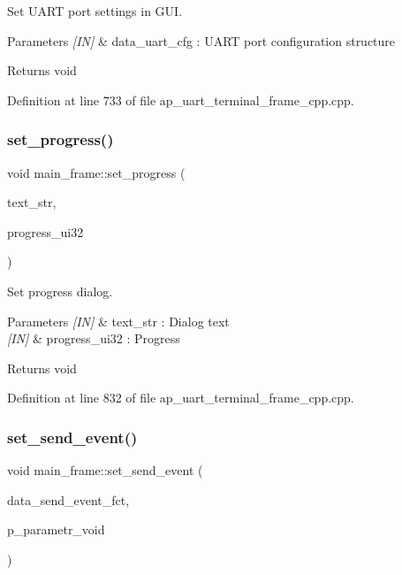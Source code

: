 Set U\+A\+RT port settings in G\+UI. 


\begin{DoxyParams}{Parameters}
{\em \mbox{[}\+I\+N\mbox{]}} & data\+\_\+uart\+\_\+cfg \+: U\+A\+RT port configuration structure \\
\hline
\end{DoxyParams}
\begin{DoxyReturn}{Returns}
void 
\end{DoxyReturn}


Definition at line 733 of file ap\+\_\+uart\+\_\+terminal\+\_\+frame\+\_\+cpp.\+cpp.

\mbox{\label{group___u_a_r_t__terminal_ga3d4cb71ba74799071aa7b09eff1c1c12}} 
\subsubsection{set\_progress()}
{\footnotesize\ttfamily void main\+\_\+frame\+::set\+\_\+progress (\begin{DoxyParamCaption}\item[{wx\+String}]{text\+\_\+str,  }\item[{uint32\+\_\+t}]{progress\+\_\+ui32 }\end{DoxyParamCaption})}



Set progress dialog. 


\begin{DoxyParams}{Parameters}
{\em \mbox{[}\+I\+N\mbox{]}} & text\+\_\+str \+: Dialog text \\
\hline
{\em \mbox{[}\+I\+N\mbox{]}} & progress\+\_\+ui32 \+: Progress \\
\hline
\end{DoxyParams}
\begin{DoxyReturn}{Returns}
void 
\end{DoxyReturn}


Definition at line 832 of file ap\+\_\+uart\+\_\+terminal\+\_\+frame\+\_\+cpp.\+cpp.

\mbox{\label{group___u_a_r_t__terminal_ga72f088ac9a84cfddd6d140b091e9da52}} 
\subsubsection{set\_send\_event()}
{\footnotesize\ttfamily void main\+\_\+frame\+::set\+\_\+send\+\_\+event (\begin{DoxyParamCaption}\item[{\textbf{ send\+\_\+event\+\_\+fct}}]{data\+\_\+send\+\_\+event\+\_\+fct,  }\item[{void $\ast$}]{p\+\_\+parametr\+\_\+void }\end{DoxyParamCaption})}



